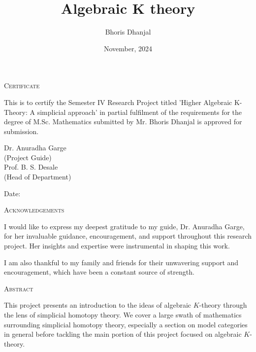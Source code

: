 \documentclass[12pt]{report}
\title{Algebraic K theory}
\author{Bhoris Dhanjal}
\date{November, 2024}
\makeatletter
\numberwithin{equation}{section}
\newcommand\frontmatter{%
	\cleardoublepage
	\@mainmatterfalse
	\pagenumbering{roman}}
\makeatother
\begin{document}
	

	\frontmatter
	
	\begin{center}
		

		{\LARGE {\textsc{Certificate}}}\\[2.5cm]
	\end{center}
	\normalsize This is to certify the Semester IV Research Project titled 'Higher Algebraic K-Theory: A simplicial approach' in partial fulfilment of the requirements for the degree of M.Sc. Mathematics  submitted by Mr. Bhoris Dhanjal is approved for submission.
	

	
	\vfill
	
	
	\begin{flushright}
		Dr. Anuradha Garge\\
		(Project Guide)\\[1.5cm]
		Prof. B. S. Desale\\
		(Head of Department)\\
	\end{flushright}
	
	\begin{flushleft}
		Date:
	\end{flushleft}
	\clearpage
	
	\begin{center}
	
	
	{\LARGE {\textsc{Acknowledgements}}}\\[1cm]
\end{center}
I would like to express my deepest gratitude to my guide, Dr. Anuradha Garge, for her invaluable guidance, encouragement, and support throughout this research project. Her insights and expertise were instrumental in shaping this work.

I am also thankful to my family and friends for their unwavering support and encouragement, which have been a constant source of strength.
	\clearpage
	\begin{center}
		
		
		{\LARGE {\textsc{Abstract}}}\\[1cm]
	\end{center}
	This project presents an introduction to the ideas of algebraic \( K \)-theory through the lens of simplicial homotopy theory. We cover a large swath of mathematics surrounding simplicial homotopy theory, especially a section on model categories in general before tackling the main portion of this project focused on algebraic \( K \)-theory.
	
\end{document}
